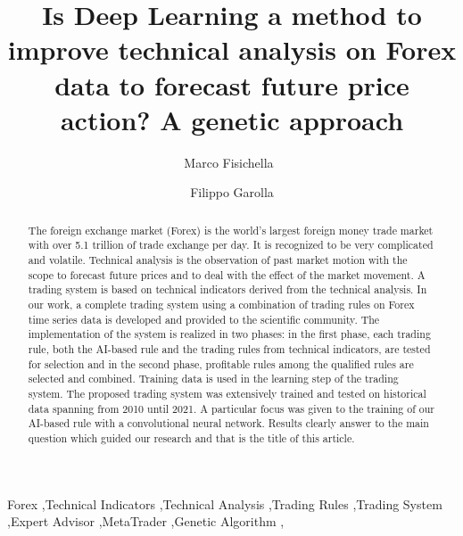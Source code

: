 \documentclass[1p]{elsarticle}
\begin{document}
\begin{frontmatter}

\title{Is Deep Learning a method to improve technical analysis on Forex data to forecast future price action? A genetic approach}

\author{Marco Fisichella~}
\address{L3S Research Center of Leibniz University of Hannover, Germany}

\author{Filippo Garolla}
\address{SLR Engineering, Graz, Austria}





\begin{abstract}
The foreign exchange market (Forex) is the world’s largest foreign money trade market with over 5.1 trillion of trade exchange per day. It is recognized to be very complicated and volatile. Technical analysis is the observation of past market motion with the scope to forecast future prices and to deal with the effect of the market movement. A trading system is based on technical indicators derived from the technical analysis. In our work, a complete trading system using a combination of trading rules on Forex time series data is developed and provided to the scientific community. The implementation of the system is realized in two phases: in the first phase, each trading rule, both the AI-based rule and the trading rules from technical indicators, are tested for selection and in the second phase, profitable rules among the qualified rules are selected and combined. Training data is used in the learning step of the trading system. The proposed trading system was extensively trained and tested on historical data spanning from 2010 until 2021. A particular focus was given to the training of our AI-based rule with a convolutional neural network. Results clearly answer to the main question which guided our research and that is the title of this article.
\end{abstract}

\begin{keyword}
Forex \sep Technical Indicators \sep Technical Analysis \sep Trading Rules \sep Trading System \sep Expert Advisor \sep MetaTrader \sep Genetic Algorithm \sep 
\end{keyword}

\end{frontmatter}
\end{document}
